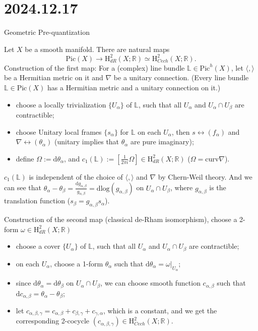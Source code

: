 \documentclass[12pt]{amsart}
\numberwithin{equation}{section}
\newcommand{\BL}{{\mathbb {L}}}
\newcommand{\BR}{{\mathbb {R}}}
\begin{document}
\section{2024.12.17}

Geometric Pre-quantization

Let $X$ be a smooth manifold. There are natural maps
\[
    \mathrm{Pic}(X) \longrightarrow  \mathrm{H}^{2}_{dR}(X;\BR) \simeq  \mathrm{H}^{2}_{Cech}(X;\BR).
\]
Construction of the first map:
For a (complex) line bundle $\BL \in \mathrm{Pic}^{h}(X)$, let $\langle , \rangle$ be a Hermitian metric on it and $\nabla$ be a unitary connection. (Every line bundle $\BL \in \mathrm{Pic}(X)$ has a Hermitian metric and a unitary connection on it.) 
\begin{itemize}
  \item choose a locally trivialization $\{U_{\alpha}\}$ of $\BL$, such that all $U_{\alpha}$ and $U_{\alpha} \cap U_{\beta}$ are contractible;
  \item choose Unitary local frames $\{s_{\alpha}\}$ for $\BL$ on each $U_{\alpha}$, then $s \leftrightarrow (f_\alpha)$ and $\nabla \leftrightarrow (\theta_\alpha)$ (unitary implies that $\theta_\alpha$ are pure imaginary);
  \item define $\Omega := \mathrm{d}\theta_\alpha$, and $c_1(\BL) := [\frac{1}{2\pi i}\Omega] \in \mathrm{H}^{2}_{dR}(X;\BR)$ ($\Omega = \mathrm{curv}\nabla$).
\end{itemize}
$c_1(\BL)$ is independent of the choice of $\langle,\rangle$ and $\nabla$ by Chern-Weil theory.
And we can see that $\theta_\alpha - \theta_\beta = \frac{\mathrm{d}g_{\alpha,\beta}}{g_{\alpha,\beta}} = \mathrm{d}\mathrm{log}(g_{\alpha,\beta})$ on $U_\alpha \cap U_\beta$, where $g_{\alpha,\beta}$ is the translation function ($s_\beta = g_{\alpha,\beta}s_\alpha$).

Construction of the second map (classical de-Rham isomorphism), choose a 2-form $\omega \in \mathrm{H}^{2}_{dR}(X;\BR)$
\begin{itemize}
  \item choose a cover $\{U_{\alpha}\}$ of $\BL$, such that all $U_{\alpha}$ and $U_{\alpha} \cap U_{\beta}$ are contractible;
  \item on each $U_\alpha$, choose a 1-form $\theta_\alpha$ such that $\mathrm{d}\theta_\alpha = \omega|_{U_\alpha}$;
  \item since $\mathrm{d}\theta_\alpha = \mathrm{d}\theta_\beta$ on $U_\alpha \cap U_\beta$, we can choose smooth function $c_{\alpha,\beta}$ such that $\mathrm{d}c_{\alpha,\beta} = \theta_\alpha - \theta_\beta$;
  \item let $c_{\alpha,\beta,\gamma} = c_{\alpha,\beta} + c_{\beta,\gamma} + c_{\gamma,\alpha}$, which is a constant, and we get the corresponding 2-cocycle $(c_{\alpha,\beta,\gamma}) \in \mathrm{H}^{2}_{Cech}(X;\BR)$.
\end{itemize}
\end{document}

